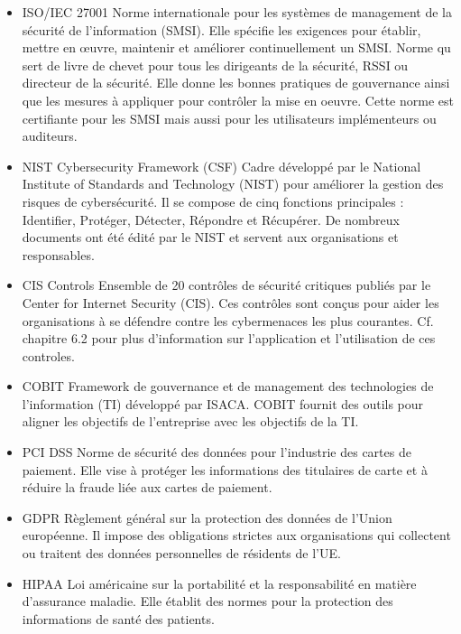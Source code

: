 \begin{itemize}
	\item ISO/IEC 27001
	Norme internationale pour les systèmes de management de la sécurité de l'information (SMSI). Elle spécifie les exigences pour établir, mettre en œuvre, maintenir et améliorer continuellement un SMSI. Norme qu sert de livre de chevet pour tous les dirigeants de la sécurité, RSSI ou directeur de la sécurité. Elle donne les bonnes pratiques de gouvernance ainsi que les mesures à appliquer pour contrôler la mise en oeuvre. Cette norme est certifiante pour les SMSI mais aussi pour les utilisateurs implémenteurs ou auditeurs.
	
	\item NIST Cybersecurity Framework (CSF)
	Cadre développé par le National Institute of Standards and Technology (NIST) pour améliorer la gestion des risques de cybersécurité. Il se compose de cinq fonctions principales : Identifier, Protéger, Détecter, Répondre et Récupérer. De nombreux documents ont été édité par le NIST et servent aux organisations et responsables.
	
	\item CIS Controls
	Ensemble de 20 contrôles de sécurité critiques publiés par le Center for Internet Security (CIS). Ces contrôles sont conçus pour aider les organisations à se défendre contre les cybermenaces les plus courantes. Cf. chapitre 6.2 pour plus d'information sur l'application et l'utilisation de ces controles.
	
	\item COBIT
	Framework de gouvernance et de management des technologies de l'information (TI) développé par ISACA. COBIT fournit des outils pour aligner les objectifs de l'entreprise avec les objectifs de la TI.
	
	\item PCI DSS
	Norme de sécurité des données pour l'industrie des cartes de paiement. Elle vise à protéger les informations des titulaires de carte et à réduire la fraude liée aux cartes de paiement.
	
	\item GDPR
	Règlement général sur la protection des données de l'Union européenne. Il impose des obligations strictes aux organisations qui collectent ou traitent des données personnelles de résidents de l'UE.
	
	\item  HIPAA
	Loi américaine sur la portabilité et la responsabilité en matière d'assurance maladie. Elle établit des normes pour la protection des informations de santé des patients.
	

\end{itemize}
